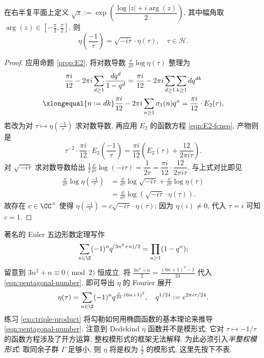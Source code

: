 \begin{proposition}
	在右半复平面上定义 $\sqrt{z} := \exp\left(\dfrac{\log|z| + i\arg(z)}{2}\right)$, 其中幅角取 $\arg(z) \in \left[-\frac{\pi}{2}, \frac{\pi}{2}\right]$. 则
	\[ \eta\left( \frac{-1}{\tau} \right) = \sqrt{-i\tau} \cdot \eta(\tau), \quad \tau \in \mathcal{H}. \]
\end{proposition}
\begin{proof}
	应用命题 \ref{prop:E2}, 将对数导数 $\frac{\dd}{\dd \tau} \log\eta(\tau)$ 整理为
	\begin{multline*}
		\frac{\pi i}{12} - 2\pi i \sum_{d \geq 1} \frac{dq^d}{1- q^d} = \frac{\pi i}{12} - 2\pi i \sum_{d \geq 1} \sum_{k \geq 1} d q^{dk} \\
		\xlongequal{n := dk} \frac{\pi i}{12} - 2\pi i \sum_{n \geq 1} \sigma_1(n) q^n = \dfrac{\pi i}{12} \cdot E_2(\tau),
	\end{multline*}
	若改为对 $\tau \mapsto \eta\left(\frac{-1}{\tau}\right)$ 求对数导数, 再应用 $E_2$ 的函数方程 \eqref{eqn:E2-fcneq}, 产物则是
	\[ \tau^{-2} \cdot \frac{\pi i}{12} \cdot E_2\left(\frac{-1}{\tau}\right) = \frac{\pi i}{12} \left(E_2(\tau) + \frac{12}{2\pi i \tau} \right). \]
	对 $\sqrt{-i\tau}$ 求对数导数给出 $\frac{1}{2} \frac{\dd}{\dd\tau} \log(-i\tau) = \dfrac{1}{2\tau} = \dfrac{\pi i}{12} \cdot \dfrac{12}{2 \pi i \tau}$. 与上式对比即见
	\begin{align*}
		\frac{\dd}{\dd \tau} \log \eta\left( \frac{-1}{\tau} \right) & = \frac{\dd}{\dd \tau} \log \sqrt{-i\tau} + \frac{\dd}{\dd \tau} \log \eta(\tau)  \\
		& = \frac{\dd}{\dd \tau} \log \left( \sqrt{-i\tau} \cdot \eta(\tau) \right).
	\end{align*}
	故存在 $c \in \CC^\times$ 使得 $\eta\left(\frac{-1}{\tau}\right) = c \sqrt{-i\tau} \cdot \eta(\tau)$; 因为 $\eta(i) \neq 0$, 代入 $\tau = i$ 可知 $c = 1$.
\end{proof}

著名的 Euler 五边形数定理写作 
\begin{equation}\label{eqn:pentagonal-number}
	\sum_{n \in \Z} (-1)^n q^{(3n^2 + n)/2} = \prod_{n \geq 1} (1 - q^n);
\end{equation}
留意到 $3n^2 + n \equiv 0 \pmod 2$ 恒成立. 将 $\frac{3n^2 + n}{2} = \frac{(6n+1)^2 - 1}{24}$ 代入 \eqref{eqn:pentagonal-number}, 即可导出 $\eta$ 的 Fourier 展开
\begin{equation}\label{eqn:eta-Fourier}
	\eta(\tau) = \sum_{n \in \Z} (-1)^n q^{ \frac{1}{24} \cdot (6n + 1)^2}, \quad q^{1/24} := e^{2\pi i \tau /24}.
\end{equation}
练习 \ref{exo:triple-product} 将勾勒如何用椭圆函数的基本理论来推导 \eqref{eqn:pentagonal-number}. 注意到 Dedekind $\eta$ 函数并不是模形式: 它对 $\tau \mapsto -1/\tau$ 的函数方程涉及了开方运算, 整权模形式的框架无法解释. 为此必须引入\emph{半整权模形式}: 取同余子群 $\Gamma$ 足够小, 则 $\eta$ 将是权为 $\frac{1}{2}$ 的模形式, 这里先按下不表. 

